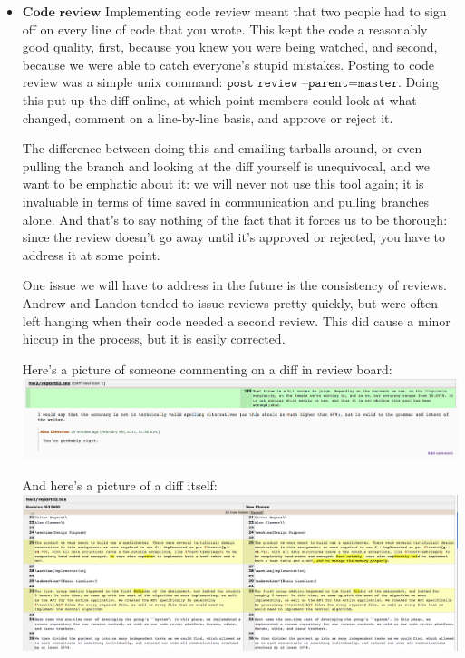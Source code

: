\documentclass[a4paper]{article}
\begin{document}
\begin{itemize}
	\item $\textbf{Code review}$ Implementing code review meant that two people had to sign off on every line of code that you wrote. This kept the code a reasonably good quality, first, because you knew you were being watched, and second, because we were able to catch everyone's stupid mistakes. Posting to code review was a simple unix command: $\texttt{post review --parent=master}$. Doing this put up the diff online, at which point members could look at what changed, comment on a line-by-line basis, and approve or reject it.
	
	The difference between doing this and emailing tarballs around, or even pulling the branch and looking at the diff yourself is unequivocal, and we want to be emphatic about it: we will never not use this tool again; it is invaluable in terms of time saved in communication and pulling branches alone. And that's to say nothing of the fact that it forces us to be thorough: since the review doesn't go away until it's approved or rejected, you have to address it at some point.
	
	One issue we will have to address in the future is the consistency of reviews. Andrew and Landon tended to issue reviews pretty quickly, but were often left hanging when their code needed a second review. This did cause a minor hiccup in the process, but it is easily corrected. 
	
	Here's a picture of someone commenting on a diff in review board:\\
	\includegraphics[scale=0.3]{review_board_diff.png}
	
	And here's a picture of a diff itself:\\
	\includegraphics[scale=0.3]{review_board_diff2.png}
	

\end{itemize}
\end{document}
